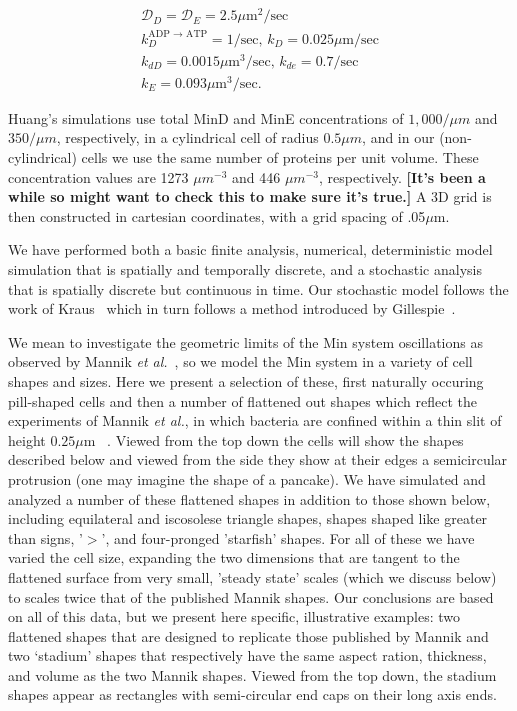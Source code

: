 \documentclass[letterpaper,twocolumn,amsmath,amssymb,pre]{revtex4-1}
\newcommand{\red}[1]{{\bf \color{red} #1}}
\newcommand{\fixme}[1]{\red{[#1]}}
\newcommand\micron{\ensuremath{\mu\text{m}}}
\begin{document}
\begin{gather*}
  \mathcal{D}_D = \mathcal{D}_{E} = 2.5\micron^2/\text{sec}\\
  k_D^{\textrm{ADP $\rightarrow$ ATP}} = 1/\textrm{sec,  }
  k_D = 0.025 \micron /\textrm{sec}\\
  k_{dD} = 0.0015 \micron^3/ \textrm{sec,  }
  k_{de} = 0.7/\textrm{sec}\\
  k_E = 0.093 \micron^3 /\textrm{sec}.
\end{gather*}

Huang's simulations use total MinD and MinE concentrations of
$1,000/\mu m$ and $350/\mu m$, respectively, in a cylindrical cell of
radius $0.5\mu m$, and in our (non-cylindrical) cells we use the same
number of proteins per unit volume.  These concentration values are
1273 $\mu m^{-3}$ and 446 $\mu m^{-3}$, respectively. \fixme{It's been
  a while so might want to check this to make sure it's true.}  A 3D
grid is then constructed in cartesian coordinates, with a grid spacing
of .05\micron.

We have performed both a basic finite analysis, numerical,
deterministic model simulation that is spatially and temporally
discrete, and a stochastic analysis that is spatially discrete but
continuous in time.  Our stochastic model follows the work of
Kraus~\cite{kraus1996crosstalk} which in turn follows a method
introduced by Gillespie~\cite{gillespie1977exact}.

We mean to investigate the geometric limits of the Min system
oscillations as observed by Mannik \emph{et
  al.}~\cite{mannik2012robustness}, so we model the Min system in a
variety of cell shapes and sizes.  Here we present a selection of
these, first naturally occuring pill-shaped cells and then a number of
flattened out shapes which reflect the experiments of Mannik \emph{et
  al.}, in which bacteria are confined within a thin slit of height
$0.25\micron$ ~\cite{mannik2012robustness}. Viewed from the top down
the cells will show the shapes described below and viewed from the
side they show at their edges a semicircular protrusion (one may
imagine the shape of a pancake). We have simulated and analyzed a
number of these flattened shapes in addition to those shown below,
including equilateral and iscosolese triangle shapes, shapes shaped
like greater than signs, '$>$', and four-pronged 'starfish' shapes.
For all of these we have varied the cell size, expanding the two
dimensions that are tangent to the flattened surface from very small,
'steady state' scales (which we discuss below) to scales twice that of
the published Mannik shapes.  Our conclusions are based on all of this
data, but we present here specific, illustrative examples: two
flattened shapes that are designed to replicate those published by
Mannik and two `stadium' shapes that respectively have the same aspect
ration, thickness, and volume as the two Mannik shapes.  Viewed from
the top down, the stadium shapes appear as rectangles with
semi-circular end caps on their long axis ends.
\end{document}
